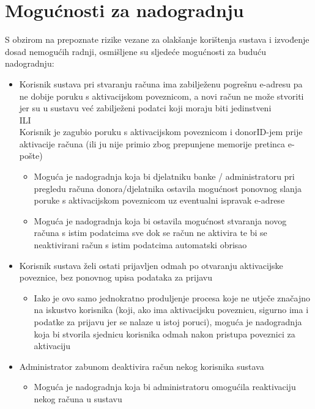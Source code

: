         \section{Mogućnosti za nadogradnju}
            \par{
            S obzirom na prepoznate rizike vezane za olakšanje korištenja sustava i izvođenje dosad nemogućih radnji, osmišljene su sljedeće mogućnosti za buduću nadogradnju:
            \begin{itemize}
            
                 \item Korisnik sustava pri stvaranju računa ima zabilježenu pogrešnu e-adresu pa ne dobije poruku s aktivacijskom poveznicom, a novi račun ne može stvoriti jer su u sustavu već zabilježeni podatci koji moraju biti jedinstveni 
                 \\ ILI
                \\ Korisnik je zagubio poruku s aktivacijskom poveznicom i donorID-jem prije aktivacije računa (ili ju nije primio zbog prepunjene memorije pretinca e-pošte)
                \begin{itemize}
                    \item Moguća je nadogradnja koja  bi djelatniku banke / administratoru pri pregledu računa donora/djelatnika ostavila mogućnost ponovnog slanja poruke s aktivacijskom poveznicom uz eventualni ispravak e-adrese
                    \item Moguća je nadogradnja koja bi ostavila mogućnost stvaranja novog računa s istim podatcima sve dok se račun ne aktivira te bi se neaktivirani račun s istim podatcima automatski obrisao
                \end{itemize}
                
                 \item Korisnik sustava želi ostati prijavljen odmah po otvaranju aktivacijske poveznice, bez ponovnog upisa podataka za prijavu
                \begin{itemize}
                    \item Iako je ovo samo jednokratno produljenje procesa koje ne utječe značajno na iskustvo korisnika (koji, ako ima aktivacijsku poveznicu, sigurno ima i podatke za prijavu jer se nalaze u istoj poruci), moguća je nadogradnja koja bi stvorila sjednicu korisnika odmah nakon pristupa poveznici za aktivaciju
                \end{itemize}
                
                 \item Administrator zabunom deaktivira račun nekog korisnika sustava
                \begin{itemize}
                    \item Moguća je nadogradnja koja bi administratoru omogućila reaktivaciju nekog računa u sustavu
                \end{itemize}
                

\end{itemize}}
